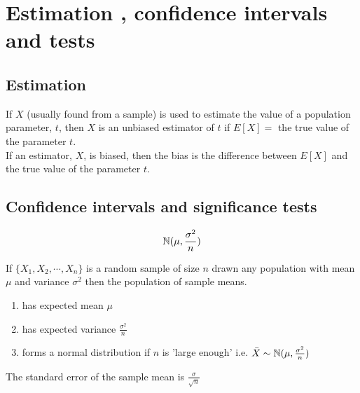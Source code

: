 \documentclass[a4paper]{article}
\begin{document}
\section{Estimation , confidence intervals and tests}
\subsection{Estimation}
\begin{defi}
	If $X$  (usually found from a sample) is used to estimate the value of a population parameter,
	$t$, then $X$ is an unbiased estimator of $t$ if $E[X] =$ the true value of the parameter $t$. \\

	If an estimator, $X$, is biased, then the bias is the difference between $E[X]$ and the true value of the parameter $t$.
\end{defi}

\begin{defi}

\end{defi}


\subsection{Confidence intervals and significance tests}
\begin{defi}
	\[
		\mathbb{N}(\mu,\frac{\sigma^2}{n})
	\]
\end{defi}

\begin{thm}
	If $\{X_1,X_2,\cdots,X_n\}$ is a random sample of size $n$ drawn any population with mean $\mu$ and variance $\sigma^2$ then the population of sample means.
	\begin{enumerate}
	\item has expected mean $\mu$
	\item has expected variance $\frac{\sigma^2}{n}$
	\item forms a normal distribution if $n$ is 'large enough' i.e. $\bar{X}\sim \mathbb{N}(\mu,\frac{\sigma^2}{n})$
	\end{enumerate}
	The standard error of the sample mean is $\frac{\sigma}{\sqrt{n}}$
\end{thm}
\end{document}
